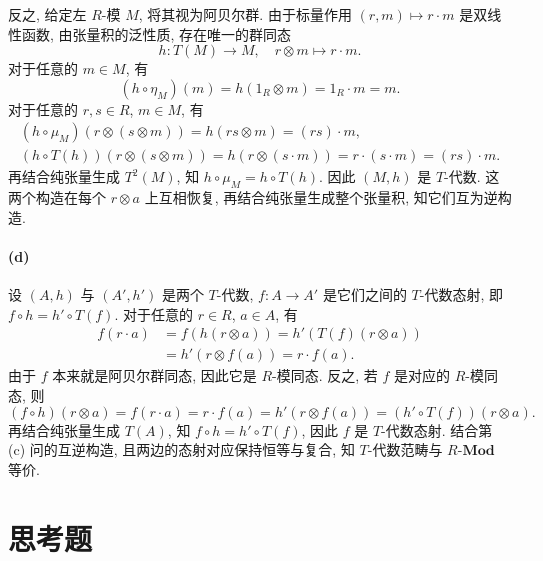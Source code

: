 \documentclass{article}
\begin{document}
\begin{solution}
	反之, 给定左 $R$-模 $M$, 将其视为阿贝尔群. 由于标量作用 $(r,m) \mapsto r \cdot m$ 是双线性函数, 由张量积的泛性质, 存在唯一的群同态
	\[ h: T(M) \to M, \quad r \otimes m \mapsto r \cdot m. \]
	对于任意的 $m \in M$, 有
	\[ (h \circ \eta_M)(m) = h(1_R \otimes m) = 1_R \cdot m = m. \]
	对于任意的 $r,s \in R$, $m \in M$, 有
	\begin{gather*}
		(h \circ \mu_M)(r \otimes (s \otimes m))
		= h(rs \otimes m) = (rs) \cdot m, \\
		(h \circ T(h))(r \otimes (s \otimes m))
		= h(r \otimes (s \cdot m)) = r \cdot (s \cdot m) = (rs) \cdot m.
	\end{gather*}
	再结合纯张量生成 $T^2(M)$, 知 $h \circ \mu_M = h \circ T(h)$. 因此 $(M,h)$ 是 $T$-代数. 这两个构造在每个 $r \otimes a$ 上互相恢复, 再结合纯张量生成整个张量积, 知它们互为逆构造.

	\paragraph{(d)} 设 $(A,h)$ 与 $(A',h')$ 是两个 $T$-代数, $f: A \to A'$ 是它们之间的 $T$-代数态射, 即 $f \circ h = h' \circ T(f)$. 对于任意的 $r \in R$, $a \in A$, 有
	\begin{align*}
		f(r \cdot a)
		&= f(h(r \otimes a))
		= h'(T(f)(r \otimes a)) \\
		&= h'(r \otimes f(a)) = r \cdot f(a).
	\end{align*}
	由于 $f$ 本来就是阿贝尔群同态, 因此它是 $R$-模同态. 反之, 若 $f$ 是对应的 $R$-模同态, 则
	\[ (f \circ h)(r \otimes a) = f(r \cdot a)
	= r \cdot f(a) = h'(r \otimes f(a))
	= (h' \circ T(f))(r \otimes a). \]
	再结合纯张量生成 $T(A)$, 知 $f \circ h = h' \circ T(f)$, 因此 $f$ 是 $T$-代数态射. 结合第 (c) 问的互逆构造, 且两边的态射对应保持恒等与复合, 知 $T$-代数范畴与 $R$-$\mathbf{Mod}$ 等价.
\end{solution}



\section*{思考题}
\enlargethispage{\baselineskip}
\end{document}
